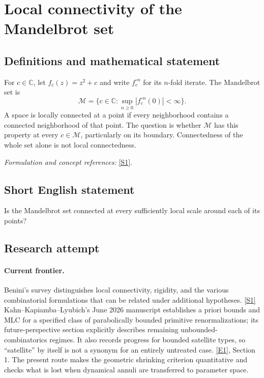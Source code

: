 \documentclass[11pt,a4paper]{article}
\newcommand{\C}{\mathbb{C}}
\newcommand{\sref}[2]{\hyperlink{source:#1:#2}{[S#2]}}
\newcommand{\eref}[2]{\hyperlink{extra:#1:#2}{[E#2]}}
\newif\ifshowcatalogue
\newcommand{\cataloguescope}[1]{\ifshowcatalogue
 \paragraph{Exact scope in the supplied catalogue.}
 \begin{quote}\small #1\end{quote}\fi}
\numberwithin{equation}{section}
\begin{document}
\setcounter{section}{0}
\clearpage
\section*{\texorpdfstring{Local connectivity of the Mandelbrot set}{Local connectivity of the Mandelbrot set}}\label{5300012}
\subsection{Definitions and mathematical statement}
For $c\in\C$, let $f_c(z)=z^2+c$ and write $f_c^{\circ n}$ for its $n$-fold iterate. The Mandelbrot set is
\[
 \mathcal M=\{c\in\C:\sup_{n\ge0}|f_c^{\circ n}(0)|<\infty\}.
\]
A space is locally connected at a point if every neighborhood contains a connected neighborhood of that point. The question is whether $\mathcal M$ has this property at every $c\in\mathcal M$, particularly on its boundary. Connectedness of the whole set alone is not local connectedness.
\par\smallskip\textit{Formulation and concept references:} \sref{5300012}{1}.
\cataloguescope{Determine whether the Mandelbrot set M = \{c in C : the orbit of 0 under z -> z\textasciicircum{}2 + c is bounded\} is locally connected at every point.}
\subsection{Short English statement}
Is the Mandelbrot set connected at every sufficiently local scale around each of its points?
\subsection{Research attempt}

\paragraph{Current frontier.}
Benini's survey distinguishes local connectivity, rigidity, and the
various combinatorial formulations that can be related under additional
hypotheses. \sref{5300012}{1}
Kahn--Kapiamba--Lyubich's June 2026 manuscript establishes a priori
bounds and MLC for a specified class of parabolically bounded primitive
renormalizations; its future-perspective section explicitly describes
remaining unbounded-combinatorics regimes.  It also records progress for
bounded satellite types, so ``satellite'' by itself is not a synonym
for an entirely untreated case. \eref{5300012}{1}, Section 1.
The present route makes the geometric shrinking criterion quantitative
and checks what is lost when dynamical annuli are transferred to
parameter space.
\end{document}
